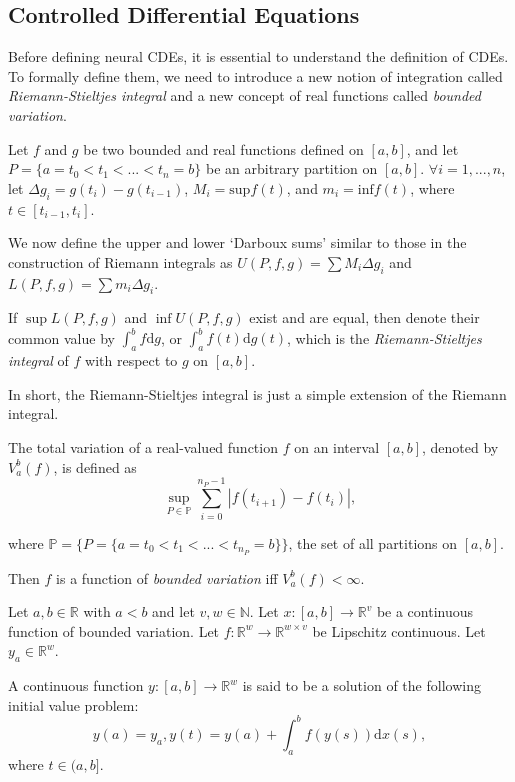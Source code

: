 \documentclass[a4paper,11pt,titlepage]{article}
\theoremstyle{definition}
\theoremstyle{plain}
\theoremstyle{remark}
\begin{document}
\subsection{Controlled Differential Equations}

Before defining neural CDEs, it is essential to understand the definition of CDEs. To formally define them, we need to introduce a new notion of integration called \textit{Riemann-Stieltjes integral} and a new concept of real functions called \textit{bounded variation}.

Let $f$ and $g$ be two bounded and real functions defined on $[a,b]$, and let $P=\{a=t_0<t_1<...<t_n=b\}$ be an arbitrary partition on $[a,b]$. $\forall i = 1,...,n$, let $\Delta g_i = g(t_i) - g(t_{i-1})$, $M_i=\mathrm{sup}f(t)$, and $m_i=\mathrm{inf}f(t)$, where $t\in[t_{i-1},t_i]$.

We now define the upper and lower ‘Darboux sums’ similar to those in the construction of Riemann integrals as $U(P,f,g)=\sum M_i\Delta g_i$ and $L(P,f,g)=\sum m_i\Delta g_i$.

If $\sup L(P,f,g)$ and $\inf U(P,f,g)$ exist and are equal, then denote their common value by $\int^b_af\mathrm{d}g$, or $\int^b_af(t)\mathrm{d}g(t)$, which is the \textit{Riemann-Stieltjes integral} of $f$ with respect to $g$ on $[a,b]$. \cite{rudin1953}

In short, the Riemann-Stieltjes integral is just a simple extension of the Riemann integral.

The total variation of a real-valued function $f$ on an interval $[a,b]$, denoted by $V_a^b(f)$, is defined as
$$\sup_{P\in\mathbb{P}}\sum_{i=0}^{n_P-1}\left|f(t_{i+1})-f(t_i)\right|,$$

where $\mathbb{P}=\{P=\{a=t_0<t_1<...<t_{n_P}=b\}\}$, the set of all partitions on $[a,b]$.

Then $f$ is a function of \textit{bounded variation} iff $V_a^b(f)<\infty$. \cite{rudin1953}

Let $a,b\in\mathbb{R}$ with $a<b$ and let $v,w\in\mathbb{N}$. Let $x:[a,b]\rightarrow\mathbb{R}^v$ be a continuous function of bounded variation. Let $f:\mathbb{R}^w\rightarrow\mathbb{R}^{w\times v}$ be Lipschitz continuous. Let $y_a\in\mathbb{R}^w$.

A continuous function $y:[a,b]\rightarrow\mathbb{R}^w$ is said to be a solution of the following initial value problem:
$$y(a)=y_a, y(t)=y(a)+\int_a^bf(y(s))\mathrm{d}x(s),$$
where $t\in(a,b].$ \cite{kidger2022neural}
\end{document}
